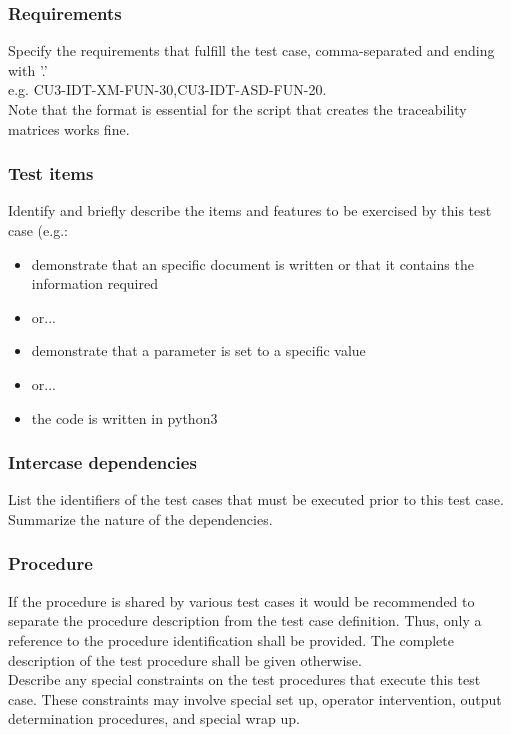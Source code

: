 \documentclass[DM,lsstdraft,STS,toc]{lsstdoc}
\begin{document}
\subsubsection{Requirements \label{sect:reqs}}
Specify the requirements that fulfill the test case, comma-separated and ending with '.'\\
e.g. CU3-IDT-XM-FUN-30,CU3-IDT-ASD-FUN-20.\\
Note that the format is essential for the script that creates the traceability matrices works fine.

\subsubsection{Test items \label{sect:tcitems}}
Identify and briefly describe the items and features to be exercised by this test case (e.g.:
\begin{itemize}
\item  demonstrate that an
specific document is written or that it contains the information required
\item or...
\item demonstrate that a parameter is set to a specific value
\item or...
\item the code is written in python3
\end{itemize}

\subsubsection{Intercase dependencies \label{interface_dependencies}}
List the identifiers of the test cases that must be executed prior to this test case. Summarize the nature of the dependencies.

\subsubsection{Procedure \label{procedures}}
If the procedure is shared by various test cases it would be recommended to separate the procedure description from the test
case definition. Thus, only a reference to the procedure identification shall be provided. The complete description of
the test procedure shall be given otherwise. \\

Describe any special constraints on the test procedures that execute this test case. These constraints may involve special set
up, operator intervention, output determination procedures, and special wrap up.
\end{document}
